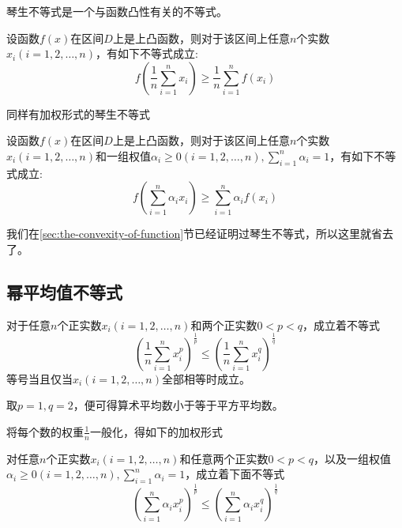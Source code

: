 琴生不等式是一个与函数凸性有关的不等式。
\begin{theorem}[琴生不等式]
  设函数$f(x)$在区间$D$上是上凸函数，则对于该区间上任意$n$个实数$x_i(i=1,2,\ldots,n)$，有如下不等式成立:
  \begin{equation}
    \label{eq:jenson-inequality-some-import-inequality}
    f \left( \frac{1}{n} \sum_{i=1}^nx_i \right) \geqslant
    \frac{1}{n} \sum_{i=1}^n f(x_i)
  \end{equation}
\end{theorem}

同样有加权形式的琴生不等式
\begin{theorem}[加权形式的琴生不等式]
  设函数$f(x)$在区间$D$上是上凸函数，则对于该区间上任意$n$个实数$x_i(i=1,2,\ldots,n)$和一组权值$\alpha_i\geqslant 0(i=1,2,\ldots,n), \sum_{i=1}^n\alpha_i=1$，有如下不等式成立:
  \begin{equation}
    \label{eq:jenson-inequality-some-import-inequality}
    f \left( \sum_{i=1}^n\alpha_ix_i \right) \geqslant
    \sum_{i=1}^n \alpha_if(x_i)
  \end{equation}
\end{theorem}

我们在\ref{sec:the-convexity-of-function}节已经证明过琴生不等式，所以这里就省去了。

\subsection{幂平均值不等式}

\begin{theorem}[幂平均值不等式]
  对于任意$n$个正实数$x_i(i=1,2,\ldots,n)$和两个正实数$0<p<q$，成立着不等式
  \begin{equation}
    \label{eq:pow-mean-inequation}
    \left( \frac{1}{n}\sum_{i=1}^nx_i^{p} \right)^{\frac{1}{p}}
    \leqslant \left( \frac{1}{n}\sum_{i=1}^nx_i^{q} \right)^{\frac{1}{q}}
  \end{equation}
  等号当且仅当$x_i(i=1,2,\ldots,n)$全部相等时成立。
\end{theorem}
取$p=1,q=2$，便可得算术平均数小于等于平方平均数。

将每个数的权重$\frac{1}{n}$一般化，得如下的加权形式
\begin{theorem}[加权幂平均值不等式]
  对任意$n$个正实数$x_i(i=1,2,\ldots,n)$和任意两个正实数$0<p<q$，以及一组权值$\alpha_i \geqslant 0(i=1,2,\ldots,n), \sum_{i=1}^n\alpha_i=1$，成立着下面不等式
  \begin{equation}
    \label{eq:pow-mean-inequation-with-weight}
    \left( \sum_{i=1}^n\alpha_ix_i^p \right)^{\frac{1}{p}}
    \leqslant \left( \sum_{i=1}^n\alpha_ix_i^q \right)^{\frac{1}{q}}
  \end{equation}
\end{theorem}

